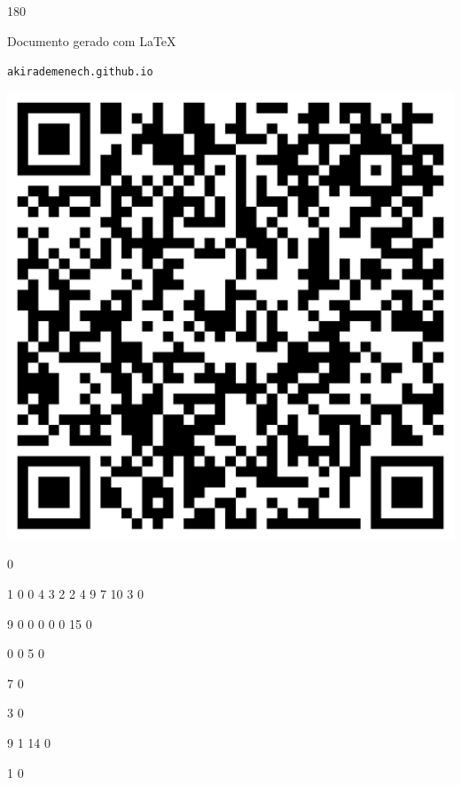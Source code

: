 \documentclass[12pt]{article}
\begin{document}
	\begin{turn}{180}	
		\begin{minipage}{\textwidth}		  
		  Documento gerado com \LaTeX			
		  
		  \texttt{akirademenech.github.io}

		  \includegraphics[height=0.3\textheight]{2e-2.pdf}

		\end{minipage}	
	\end{turn}  
		  
		\vfill  
		  
{
	0	%

	1	%
	0	%
	0	%
	4	%
	3	%
	2	%
	2	%
	4	%
	9	%
	7	%
	10	%
	3	%
	0	%

	9	%
	0	%
	0	%
	0	%
	0	%
	0	%
	15	%
	0	%

	0	%
	0	%
	5	%
	0	%

	7	%
	0	%

	3	%
	0	%

	9	%
	1	%
	14	%
	0	%

	1	%
	0	%

}	  
		    	
\end{document}
